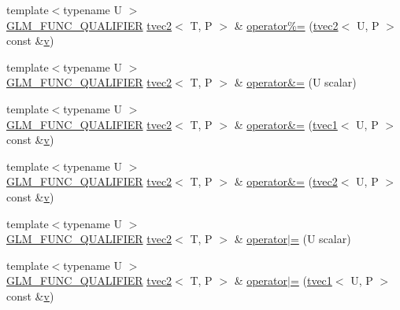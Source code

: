 \begin{DoxyCompactItemize}
\item 
{\footnotesize template$<$typename U $>$ }\\\mbox{\hyperlink{setup_8hpp_a33fdea6f91c5f834105f7415e2a64407}{G\+L\+M\+\_\+\+F\+U\+N\+C\+\_\+\+Q\+U\+A\+L\+I\+F\+I\+ER}} \mbox{\hyperlink{structglm_1_1tvec2}{tvec2}}$<$ T, P $>$ \& \mbox{\hyperlink{structglm_1_1tvec2_aaf4c73ee8e801c26093def1d49df1df1}{operator\%=}} (\mbox{\hyperlink{structglm_1_1tvec2}{tvec2}}$<$ U, P $>$ const \&\mbox{\hyperlink{glad_8h_a14cfbe2fc2234f5504618905b69d1e06}{v}})
\item 
{\footnotesize template$<$typename U $>$ }\\\mbox{\hyperlink{setup_8hpp_a33fdea6f91c5f834105f7415e2a64407}{G\+L\+M\+\_\+\+F\+U\+N\+C\+\_\+\+Q\+U\+A\+L\+I\+F\+I\+ER}} \mbox{\hyperlink{structglm_1_1tvec2}{tvec2}}$<$ T, P $>$ \& \mbox{\hyperlink{structglm_1_1tvec2_a8626374eefdd6f315306511248b3b261}{operator\&=}} (U scalar)
\item 
{\footnotesize template$<$typename U $>$ }\\\mbox{\hyperlink{setup_8hpp_a33fdea6f91c5f834105f7415e2a64407}{G\+L\+M\+\_\+\+F\+U\+N\+C\+\_\+\+Q\+U\+A\+L\+I\+F\+I\+ER}} \mbox{\hyperlink{structglm_1_1tvec2}{tvec2}}$<$ T, P $>$ \& \mbox{\hyperlink{structglm_1_1tvec2_a061aeb63e00510f372dc949c7ad5af98}{operator\&=}} (\mbox{\hyperlink{structglm_1_1tvec1}{tvec1}}$<$ U, P $>$ const \&\mbox{\hyperlink{glad_8h_a14cfbe2fc2234f5504618905b69d1e06}{v}})
\item 
{\footnotesize template$<$typename U $>$ }\\\mbox{\hyperlink{setup_8hpp_a33fdea6f91c5f834105f7415e2a64407}{G\+L\+M\+\_\+\+F\+U\+N\+C\+\_\+\+Q\+U\+A\+L\+I\+F\+I\+ER}} \mbox{\hyperlink{structglm_1_1tvec2}{tvec2}}$<$ T, P $>$ \& \mbox{\hyperlink{structglm_1_1tvec2_a9b368287482b9a3218f99cc238d0ac97}{operator\&=}} (\mbox{\hyperlink{structglm_1_1tvec2}{tvec2}}$<$ U, P $>$ const \&\mbox{\hyperlink{glad_8h_a14cfbe2fc2234f5504618905b69d1e06}{v}})
\item 
{\footnotesize template$<$typename U $>$ }\\\mbox{\hyperlink{setup_8hpp_a33fdea6f91c5f834105f7415e2a64407}{G\+L\+M\+\_\+\+F\+U\+N\+C\+\_\+\+Q\+U\+A\+L\+I\+F\+I\+ER}} \mbox{\hyperlink{structglm_1_1tvec2}{tvec2}}$<$ T, P $>$ \& \mbox{\hyperlink{structglm_1_1tvec2_a1eff9e49c1834396e38d1a59fb0ab910}{operator$\vert$=}} (U scalar)
\item 
{\footnotesize template$<$typename U $>$ }\\\mbox{\hyperlink{setup_8hpp_a33fdea6f91c5f834105f7415e2a64407}{G\+L\+M\+\_\+\+F\+U\+N\+C\+\_\+\+Q\+U\+A\+L\+I\+F\+I\+ER}} \mbox{\hyperlink{structglm_1_1tvec2}{tvec2}}$<$ T, P $>$ \& \mbox{\hyperlink{structglm_1_1tvec2_a843e403f0c04d10bcbe3a7ffe63454b9}{operator$\vert$=}} (\mbox{\hyperlink{structglm_1_1tvec1}{tvec1}}$<$ U, P $>$ const \&\mbox{\hyperlink{glad_8h_a14cfbe2fc2234f5504618905b69d1e06}{v}})

\end{DoxyCompactItemize}
